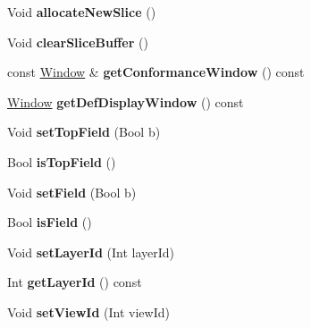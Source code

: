 \begin{DoxyCompactItemize}
\item 
\mbox{\label{class_t_com_pic_adce1d900df59e9d84be18088382718b6}} 
Void {\bfseries allocate\+New\+Slice} ()
\item 
\mbox{\label{class_t_com_pic_acd151b115701b59e8585686b10434895}} 
Void {\bfseries clear\+Slice\+Buffer} ()
\item 
\mbox{\label{class_t_com_pic_a768ae1ed28f0211110fbff775325139d}} 
const \hyperlink{class_window}{Window} \& {\bfseries get\+Conformance\+Window} () const
\item 
\mbox{\label{class_t_com_pic_a3969787e367c9b4f73f7c85299de83bd}} 
\hyperlink{class_window}{Window} {\bfseries get\+Def\+Display\+Window} () const
\item 
\mbox{\label{class_t_com_pic_aad341e8741a10bb094d5eae97a041af3}} 
Void {\bfseries set\+Top\+Field} (Bool b)
\item 
\mbox{\label{class_t_com_pic_a13d3f92da3e58127155cdf2ef42c5411}} 
Bool {\bfseries is\+Top\+Field} ()
\item 
\mbox{\label{class_t_com_pic_aeda2316999f239d7b2ca5a9efe5cad94}} 
Void {\bfseries set\+Field} (Bool b)
\item 
\mbox{\label{class_t_com_pic_a9e9c7d11663b8427a6be08f77ed98ad8}} 
Bool {\bfseries is\+Field} ()
\item 
\mbox{\label{class_t_com_pic_ae1fd40773d5fff54e7440faead4f000a}} 
Void {\bfseries set\+Layer\+Id} (Int layer\+Id)
\item 
\mbox{\label{class_t_com_pic_a56c1ac8c129315ee5f1b6bbc91436178}} 
Int {\bfseries get\+Layer\+Id} () const
\item 
\mbox{\label{class_t_com_pic_a6ee141b4c7aba19a05f7814c236e6a8f}} 
Void {\bfseries set\+View\+Id} (Int view\+Id)
\item 
\mbox{\label{class_t_com_pic_af1cc337d408b5d2dca1c91fb9fa3e4ac}} 

\end{DoxyCompactItemize}
